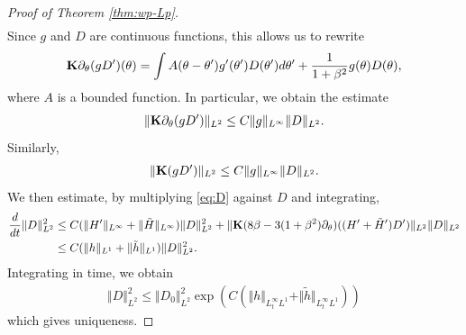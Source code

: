 \documentclass[10pt]{article}
\theoremstyle{definition}
\theoremstyle{remark}
\numberwithin{equation}{section}
\newcommand{\nrm}[1]{\Vert#1\Vert}
\newcommand{\rd}{\partial}
\newcommand{\0}{\emptyset}
\newcommand{\bt}{\beta}
\newcommand{\tht}{\theta}
\newcommand{\bfK}{{\bf K}}
\begin{document}
\begin{proof}[Proof of Theorem \ref{thm:wp-Lp}]
\begin{equation*}
\begin{split}
			\end{split}
		\end{equation*} Since $g$ and $D$ are continuous functions, this allows us to rewrite \begin{equation*}
			\begin{split}
				\bfK\rd_\tht (g D')(\tht) = \int A(\tht-\tht')g'(\tht')D(\tht')d\tht' + \frac{1}{1+\bt^2} g(\tht) D(\tht),
			\end{split}
		\end{equation*} where $A$ is a bounded function. In particular, we obtain the estimate \begin{equation*}
			\begin{split}
				\nrm{ \bfK\rd_\tht (g D') }_{L^2} \le C\nrm{g}_{L^\infty} \nrm{D}_{L^2}. 
			\end{split}
		\end{equation*} Similarly, \begin{equation*}
			\begin{split}
				\nrm{ \bfK (g D') }_{L^2} \le C\nrm{g}_{L^\infty} \nrm{D}_{L^2}. 
			\end{split}
		\end{equation*} We then estimate, by multiplying \eqref{eq:D} against $D$ and integrating, \begin{equation*}
			\begin{split}
				\frac{d}{dt} \nrm{D}_{L^2}^2 &\le C( \nrm{H'}_{L^\infty} + \nrm{\tilde{H}}_{L^\infty} ) \nrm{D}_{L^2}^2 + \nrm{     \bfK(8\bt -3(1+\bt^2)\rd_\tht) ( (H'+ \tilde{H}')D') }_{L^2} \nrm{D}_{L^2} \\
				& \le C( \nrm{h}_{L^1} + \nrm{\tilde{h}}_{L^1} ) \nrm{D}_{L^2}^2. 
			\end{split}
		\end{equation*} Integrating in time, we obtain \begin{equation*}
			\begin{split}
				\nrm{D}_{L^2}^2 \le \nrm{D_0}_{L^2}^2 \exp\left(  C( \nrm{h}_{L^\infty_t L^1} + \nrm{\tilde{h}}_{L^\infty_t L^1} ) \right)
			\end{split}
		\end{equation*} which gives uniqueness. 
		
		
		
		\medskip
		

\end{proof}
\end{document}
